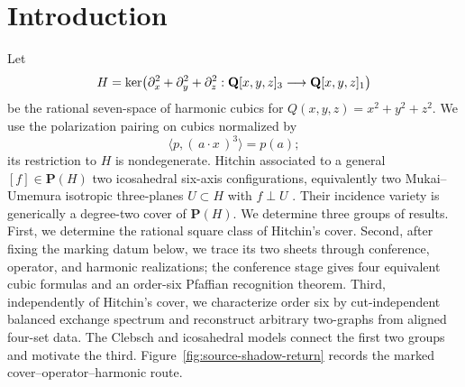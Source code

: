 \section{Introduction}

Let
\[
 H=\ker\!\left(\partial_x^2+\partial_y^2+\partial_z^2:
 \mathbf Q[x,y,z]_3\longrightarrow\mathbf Q[x,y,z]_1\right)
\]
be the rational seven-space of harmonic cubics for
\(Q(x,y,z)=x^2+y^2+z^2\).  We use the polarization pairing on cubics
normalized by
\[
 \langle p,(\,a\mathbin{\cdot}x\,)^3\rangle=p(a);
\]
its restriction to \(H\) is nondegenerate.  Hitchin associated to a
general \([f]\in\mathbf P(H)\) two icosahedral six-axis configurations,
equivalently two Mukai--Umemura isotropic three-planes \(U\subset H\) with
\(f\perp U\) \cite{HitchinIcosahedron,HitchinBundles}.  Their incidence
variety is generically a degree-two cover of \(\mathbf P(H)\).  We determine
three groups of results.  First, we determine the rational square class of
Hitchin's cover.  Second, after fixing the marking datum below, we trace its
two sheets through conference, operator, and harmonic realizations; the
conference stage gives four equivalent cubic formulas and an order-six
Pfaffian recognition theorem.  Third, independently of Hitchin's cover, we
characterize order six by cut-independent balanced exchange spectrum and
reconstruct arbitrary two-graphs from aligned four-set data.  The Clebsch and
icosahedral models connect the first two groups and motivate the third.
Figure~\ref{fig:source-shadow-return} records the marked
cover--operator--harmonic route.


